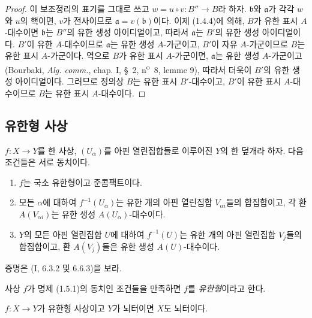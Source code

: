\begin{proof}
이 보조정리의 표기를 그대로 쓰고 $w=u\circ v:B''\to B$라 하자.
$\mathfrak b$와 $\mathfrak a$가 각각 $w$와 $u$의 핵이면, $v$가
전사이므로 $\mathfrak a=v(\mathfrak b)$이다. 이제 (1.4.4)에 의해,
$B$가 유한 표시 $A$-대수이면 $\mathfrak b$는 $B''$의 유한 생성
아이디얼이고, 따라서 $\mathfrak a$는 $B'$의 유한 생성 아이디얼이다.
$B'$이 유한 $A$-대수이므로 $\mathfrak a$는 유한 생성 $A$-가군이고,
$B'$이 자유 $A$-가군이므로 $B$는 유한 표시 $A$-가군이다. 역으로
$B$가 유한 표시 $A$-가군이면, $\mathfrak a$는 유한 생성 $A$-가군이고
(Bourbaki, \emph{Alg. comm.}, chap. I, \S~2,
n\textsuperscript{o}~8, lemme 9), 따라서 더욱이 $B'$의 유한 생성
아이디얼이다. 그러므로 정의상 $B$는 유한 표시 $B'$-대수이고,
$B'$이 유한 표시 $A$-대수이므로 $B$는 유한 표시 $A$-대수이다.
\end{proof}

\subsection{유한형 사상}
\label{subsection:IV.1.5-fr}

\begin{proposition}[1.5.1]
\label{IV.1.5.1-fr}
$f:X\to Y$를 한 사상, $(U_\alpha)$를 아핀 열린집합들로 이루어진
$Y$의 한 덮개라 하자. 다음 조건들은 서로 동치이다.
\begin{enumerate}
  \item[a)] $f$는 국소 유한형이고 준콤팩트이다.
  \item[b)] 모든 $\alpha$에 대하여 $f^{-1}(U_\alpha)$는 유한 개의
  아핀 열린집합 $V_{\alpha i}$들의 합집합이고, 각 환
  $A(V_{\alpha i})$는 유한 생성 $A(U_\alpha)$-대수이다.
  \item[c)] $Y$의 모든 아핀 열린집합 $U$에 대하여 $f^{-1}(U)$는
  유한 개의 아핀 열린집합 $V_j$들의 합집합이고, 환 $A(V_j)$들은
  유한 생성 $A(U)$-대수이다.
\end{enumerate}
\end{proposition}

증명은 (I, 6.3.2 및 6.6.3)을 보라.

\begin{definition}[1.5.2]
\label{IV.1.5.2-fr}
사상 $f$가 명제 (1.5.1)의 동치인 조건들을 만족하면 $f$를
\emph{유한형}이라고 한다.
\end{definition}


\begin{proposition}[1.5.3]
\label{IV.1.5.3-fr}
$f:X\to Y$가 유한형 사상이고 $Y$가 뇌터이면 $X$도 뇌터이다.
\end{proposition}

